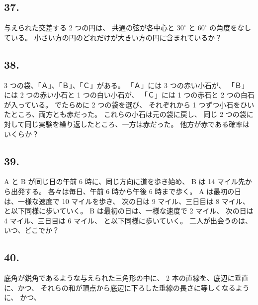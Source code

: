 \begin{flushright}
[3/89]
\end{flushright}

\subsection*{37.}

与えられた交差する 2 つの円は、
共通の弦が各中心と $30^\circ$ と $60^\circ$ の角度をなしている。
小さい方の円のどれだけが大きい方の円に含まれているか？

\begin{flushright}
[12/91]
\end{flushright}

\subsection*{38.}

 3 つの袋、「Ａ」、「Ｂ」、「Ｃ」がある。
「Ａ」には 3 つの赤い小石が、
「Ｂ」には 2 つの赤い小石と 1 つの白い小石が、
「Ｃ」には 1 つの赤石と 2 つの白石が入っている。
でたらめに 2 つの袋を選び、
それぞれから 1 つずつ小石をひいたところ、両方とも赤だった。
これらの小石は元の袋に戻し、
同じ 2 つの袋に対して同じ実験を繰り返したところ、一方は赤だった。
他方が赤である確率はいくらか？

\begin{flushright}
[3/76]
\end{flushright}

\subsection*{39.}

A と B が同じ日の午前 6 時に、同じ方向に道を歩き始め、
B は 14 マイル先から出発する。
各々は毎日、午前 6 時から午後 6 時まで歩く。
A は最初の日は、一様な速度で 10 マイルを歩き、
次の日は 9 マイル、三日目は 8 マイル、
と以下同様に歩いていく。
B は最初の日は、一様な速度で 2 マイル、
次の日は 4 マイル、三日目は 6 マイル、
と以下同様に歩いていく。
二人が出会うのは、いつ、どこでか？

\begin{flushright}
[16/3/78]
\end{flushright}

\subsection*{40.}
底角が鋭角であるような与えられた三角形の中に、
2 本の直線を、底辺に垂直に、かつ、
それらの和が頂点から底辺に下ろした垂線の長さに等しくなるように、
かつ、

